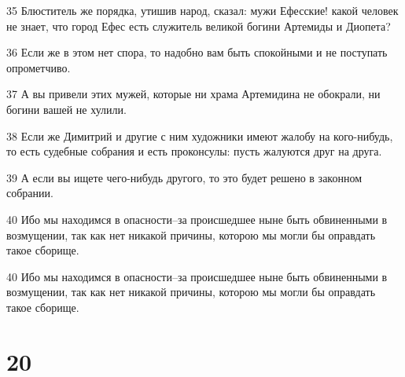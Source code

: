 \par 35 Блюститель же порядка, утишив народ, сказал: мужи Ефесские! какой человек не знает, что город Ефес есть служитель великой богини Артемиды и Диопета?
\par 36 Если же в этом нет спора, то надобно вам быть спокойными и не поступать опрометчиво.
\par 37 А вы привели этих мужей, которые ни храма Артемидина не обокрали, ни богини вашей не хулили.
\par 38 Если же Димитрий и другие с ним художники имеют жалобу на кого-нибудь, то есть судебные собрания и есть проконсулы: пусть жалуются друг на друга.
\par 39 А если вы ищете чего-нибудь другого, то это будет решено в законном собрании.
\par 40 Ибо мы находимся в опасности--за происшедшее ныне быть обвиненными в возмущении, так как нет никакой причины, которою мы могли бы оправдать такое сборище.
\par 40 Ибо мы находимся в опасности--за происшедшее ныне быть обвиненными в возмущении, так как нет никакой причины, которою мы могли бы оправдать такое сборище.

\chapter{20}

